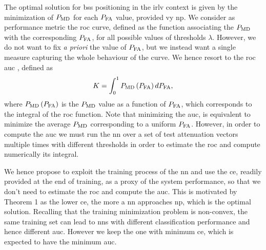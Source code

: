 \documentclass[conference,final]{IEEEtran}
\begin{document}
The optimal solution for \acp{bs} positioning in the \ac{irlv} context is given by the minimization of $P_{\rm MD}$ for each $P_{\rm FA}$ value, provided vy \ac{np}. We consider as performance metric the \ac{roc} curve, defined as the  function associating the $P_{\rm MD}$ with the corresponding $P_{\rm FA}$, for all possible values of thresholds $\lambda$. However, we do not want to fix {\em a priori} the value of $P_{\rm FA}$, but we instead want a single measure capturing the whole behaviour of the curve. We hence resort to the \ac{roc} \ac{auc} \cite{hanley-82}, defined as 
\begin{equation}
    K  = \int_{0}^{1} P_{\rm MD}\left(P_{\rm FA}\right) d P_{\rm FA},
\end{equation}
where $P_{\rm MD}\left(P_{\rm FA}\right)$ is the $P_{\rm MD}$ value as a function of $P_{\rm FA}$, which corresponds to the integral of the \ac{roc} function. Note that minimizing the \ac{auc}, is equivalent to minimize the average $P_{\rm MD}$ corresponding to a uniform $P_{\rm FA}$.
However, in order to compute the \ac{auc} we must run the \ac{nn} over a set of test attenuation vectors multiple times with different thresholds in order to estimate the \ac{roc} and compute numerically its integral.

We hence propose to exploit the training process of the \ac{nn} and use the \ac{ce}, readily provided at the end of training, as a proxy of the system performance, so that we don't need to estimate the \ac{roc} and compute the \ac{auc}. This is motivated by Theorem 1 as the lower \ac{ce}, the more a \ac{nn} approaches \ac{np}, which is the optimal solution. 
Recalling that the training minimization problem is non-convex, the same training set can lead to \acp{nn} with different classification performance and hence different \ac{auc}. However we keep the one with minimum \ac{ce}, which is expected to have the minimum \ac{auc}.
\end{document}
